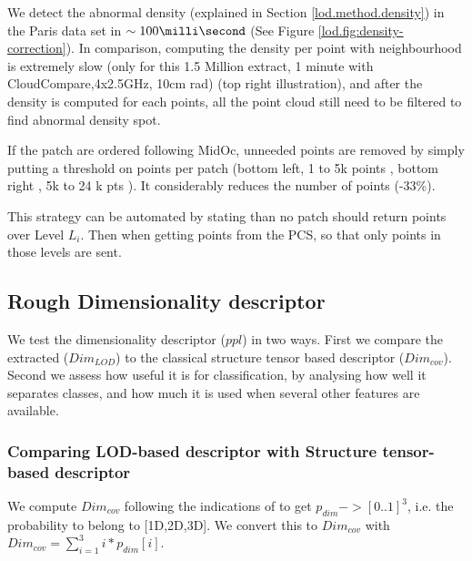 		We detect the abnormal density (explained in Section \ref{lod.method.density}) in the Paris data set in $\sim 100 \milli \second$ 
		(See Figure \ref{lod.fig:density-correction}). 
		In comparison, computing the density per point with neighbourhood is extremely slow (only for this 1.5 Million extract, 1 minute with CloudCompare,4x2.5GHz, 10cm rad) (top right illustration), and after the density is computed for each points, all the point cloud still need to be filtered to find abnormal density spot.
		
		If the patch are ordered following MidOc, unneeded points are removed by simply putting a threshold on points per patch (bottom left, 1 to 5k points \per \cubic \meter , bottom right , 5k to 24 k pts \per \cubic \meter). It considerably reduces the number of points (-33\%). 
		
		This strategy can be automated by stating than no patch should return points over Level $L_i$. Then when getting points from the PCS, so that only points in those levels are sent.
	
	\subsection{Rough Dimensionality descriptor}
		\label{lod.result.dim_descriptor}
		We test the dimensionality descriptor ($ppl$) in two ways.
		First we compare the extracted ($Dim_{LOD}$) to the classical structure tensor based descriptor ($Dim_{cov}$).
		Second we assess how useful it is for classification, 
		by analysing how well it separates classes, and how much it is used when 
		several other features are available.
		
		\subsubsection{Comparing LOD-based descriptor with Structure tensor-based descriptor}
		We compute $Dim_{cov}$ following the indications of \cite{Weinmann2015} to get $p_{dim}->[0..1]^3$, i.e. the probability to belong to [1D,2D,3D].
		We convert this to $Dim_{cov}$ with $Dim_{cov}=\sum_{i=1}^{3}{i*p_{dim}[i]}$.
		
